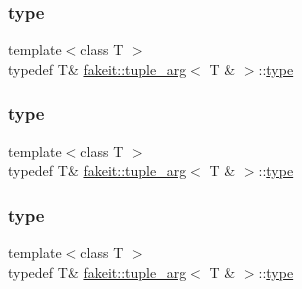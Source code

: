 \subsubsection{\texorpdfstring{type}{type}\hspace{0.1cm}{\footnotesize\ttfamily [4/9]}}
{\footnotesize\ttfamily template$<$class T $>$ \\
typedef T\& \mbox{\hyperlink{structfakeit_1_1tuple__arg}{fakeit\+::tuple\+\_\+arg}}$<$ T \& $>$\+::\mbox{\hyperlink{structfakeit_1_1tuple__arg_3_01T_01_6_01_4_aeee261e6ee2cf07e3bc1fd7783d41a67}{type}}}

\mbox{\label{structfakeit_1_1tuple__arg_3_01T_01_6_01_4_aeee261e6ee2cf07e3bc1fd7783d41a67}} 
\subsubsection{\texorpdfstring{type}{type}\hspace{0.1cm}{\footnotesize\ttfamily [5/9]}}
{\footnotesize\ttfamily template$<$class T $>$ \\
typedef T\& \mbox{\hyperlink{structfakeit_1_1tuple__arg}{fakeit\+::tuple\+\_\+arg}}$<$ T \& $>$\+::\mbox{\hyperlink{structfakeit_1_1tuple__arg_3_01T_01_6_01_4_aeee261e6ee2cf07e3bc1fd7783d41a67}{type}}}

\mbox{\label{structfakeit_1_1tuple__arg_3_01T_01_6_01_4_aeee261e6ee2cf07e3bc1fd7783d41a67}} 
\subsubsection{\texorpdfstring{type}{type}\hspace{0.1cm}{\footnotesize\ttfamily [6/9]}}
{\footnotesize\ttfamily template$<$class T $>$ \\
typedef T\& \mbox{\hyperlink{structfakeit_1_1tuple__arg}{fakeit\+::tuple\+\_\+arg}}$<$ T \& $>$\+::\mbox{\hyperlink{structfakeit_1_1tuple__arg_3_01T_01_6_01_4_aeee261e6ee2cf07e3bc1fd7783d41a67}{type}}}

\mbox{\label{structfakeit_1_1tuple__arg_3_01T_01_6_01_4_aeee261e6ee2cf07e3bc1fd7783d41a67}} 
